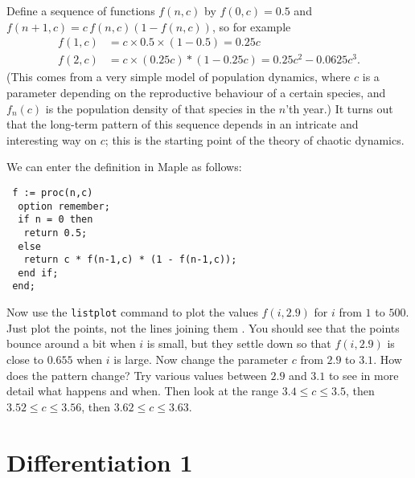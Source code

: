 \documentclass[a4paper,10pt]{amsbook}
\numberwithin{example}{chapter}
\begin{document}
\begin{exercise}
 Define a sequence of functions $f(n,c)$ by $f(0,c)=0.5$ and
 $f(n+1,c)=c\,f(n,c)(1-f(n,c))$, so for example
 \begin{align*}
  f(1,c) &= c\times 0.5 \times (1-0.5) = 0.25 c \\
  f(2,c) &= c \times (0.25 c) * (1-0.25c) = 0.25c^2 - 0.0625 c^3. 
 \end{align*}
 (This comes from a very simple model of population dynamics, where
 $c$ is a parameter depending on the reproductive behaviour of a
 certain species, and $f_n(c)$ is the population density of that
 species in the $n$'th year.)  It turns out that the long-term
 pattern of this sequence depends in an intricate and interesting way
 on $c$; this is the starting point of the theory of chaotic
 dynamics. 

 We can enter the definition in Maple as follows:
\begin{verbatim}
 f := proc(n,c)
  option remember;
  if n = 0 then
   return 0.5;
  else 
   return c * f(n-1,c) * (1 - f(n-1,c));
  end if;
 end;
\end{verbatim}
 Now use the \verb~listplot~ command to plot the values $f(i,2.9)$
 for $i$ from $1$ to $500$.  Just plot the points, not the lines
 joining them \note{\NOTElistplotstyle}.  You should see that the
 points bounce around a bit when $i$ is small, but they settle down so
 that $f(i,2.9)$ is close to $0.655$ when $i$ is large.  Now change
 the parameter $c$ from $2.9$ to $3.1$.  How does the pattern change?
 Try various values between $2.9$ and $3.1$ to see in more detail what
 happens and when.  Then look at the range $3.4\leq c\leq 3.5$, then
 $3.52\leq c\leq 3.56$, then $3.62\leq c\leq 3.63$. 

\end{exercise}

\chapter{Differentiation 1}
\end{document}
